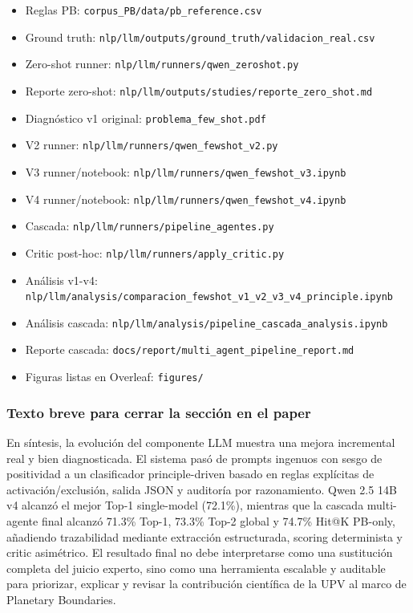 \begin{itemize}
\item Reglas PB: \texttt{corpus\_PB/data/pb\_reference.csv}
\item Ground truth: \texttt{nlp/llm/outputs/ground\_truth/validacion\_real.csv}
\item Zero-shot runner: \texttt{nlp/llm/runners/qwen\_zeroshot.py}
\item Reporte zero-shot: \texttt{nlp/llm/outputs/studies/reporte\_zero\_shot.md}
\item Diagnóstico v1 original: \texttt{problema\_few\_shot.pdf}
\item V2 runner: \texttt{nlp/llm/runners/qwen\_fewshot\_v2.py}
\item V3 runner/notebook: \texttt{nlp/llm/runners/qwen\_fewshot\_v3.ipynb}
\item V4 runner/notebook: \texttt{nlp/llm/runners/qwen\_fewshot\_v4.ipynb}
\item Cascada: \texttt{nlp/llm/runners/pipeline\_agentes.py}
\item Critic post-hoc: \texttt{nlp/llm/runners/apply\_critic.py}
\item Análisis v1-v4: \texttt{nlp/llm/analysis/comparacion\_fewshot\_v1\_v2\_v3\_v4\_principle.ipynb}
\item Análisis cascada: \texttt{nlp/llm/analysis/pipeline\_cascada\_analysis.ipynb}
\item Reporte cascada: \texttt{docs/report/multi\_agent\_pipeline\_report.md}
\item Figuras listas en Overleaf: \texttt{figures/}
\end{itemize}

\subsubsection*{Texto breve para cerrar la sección en el paper}

En síntesis, la evolución del componente LLM muestra una mejora incremental real y bien diagnosticada. El sistema pasó de prompts ingenuos con sesgo de positividad a un clasificador principle-driven basado en reglas explícitas de activación/exclusión, salida JSON y auditoría por razonamiento. Qwen 2.5 14B v4 alcanzó el mejor Top-1 single-model (72.1\%), mientras que la cascada multi-agente final alcanzó 71.3\% Top-1, 73.3\% Top-2 global y 74.7\% Hit@K PB-only, añadiendo trazabilidad mediante extracción estructurada, scoring determinista y critic asimétrico. El resultado final no debe interpretarse como una sustitución completa del juicio experto, sino como una herramienta escalable y auditable para priorizar, explicar y revisar la contribución científica de la UPV al marco de Planetary Boundaries.


